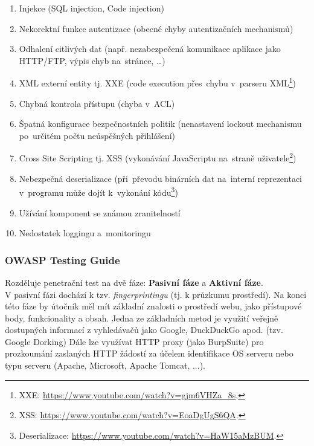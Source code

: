 \begin{enumerate}[noitemsep]
    \item Injekce (SQL injection, Code injection)
    \item Nekorektní funkce autentizace (obecné chyby autentizačních mechanismů)
    \item Odhalení citlivých dat (např. nezabezpečená komunikace aplikace jako HTTP/FTP, výpis chyb na~stránce, \dots)
    \item XML externí entity tj. XXE (code execution přes~chybu v~parseru XML\footnote{XXE: \url{https://www.youtube.com/watch?v=gjm6VHZa_8s}.})
    \item Chybná kontrola přístupu (chyba v~ACL)
    \item Špatná konfigurace bezpečnostních politik (nenastavení lockout mechanismu po~určitém počtu neúspěšných přihlášení)
    \item Cross Site Scripting tj. XSS (vykonávání JavaScriptu na~straně uživatele\footnote{XSS: \url{https://www.youtube.com/watch?v=EoaDgUgS6QA}.})
    \item Nebezpečná deserializace (při~převodu binárních dat na~interní reprezentaci v~programu může dojít k~vykonání kódu\footnote{Deserializace: \url{https://www.youtube.com/watch?v=HaW15aMzBUM}.})
    \item Užívání komponent se známou zranitelností
    \item Nedostatek loggingu a~monitoringu
\end{enumerate}

\clearpage

\subsubsection{OWASP Testing Guide}

Rozděluje penetrační test na dvě fáze: \textbf{Pasivní fáze} a \textbf{Aktivní fáze}.
\\

V pasivní fázi dochází k tzv. \textit{fingerprintingu} (tj. k průzkumu prostředí). Na konci této fáze by útočník měl mít základní znalosti o prostředí webu, jako přístupové body, funkcionality a obsah. Jedna ze základních metod je využití veřejně dostupných informací z vyhledávačů jako Google, DuckDuckGo apod. (tzv. Google Dorking) Dále lze využívat HTTP proxy (jako BurpSuite) pro prozkoumání zaslaných HTTP žádostí za účelem identifikace OS serveru nebo typu serveru (Apache, Microsoft, Apache Tomcat, ...). 
\\

